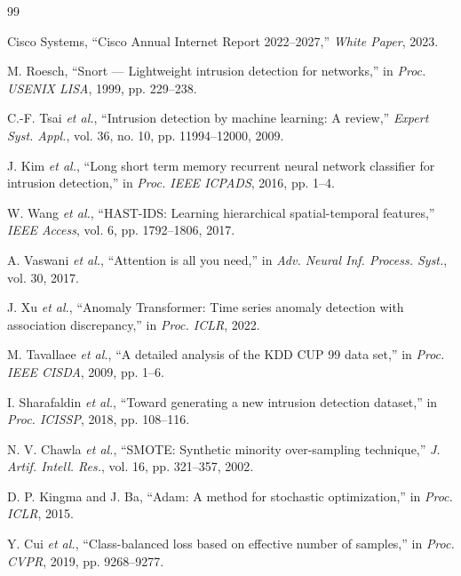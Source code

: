 \documentclass[conference]{IEEEtran}
\begin{document}
\balance
\begin{thebibliography}{99}

	Cisco Systems, ``Cisco Annual Internet Report 2022--2027,''
	\textit{White Paper}, 2023.

	M. Roesch, ``Snort --- Lightweight intrusion detection for networks,''
	in \textit{Proc. USENIX LISA}, 1999, pp. 229--238.

	C.-F. Tsai \textit{et al.}, ``Intrusion detection by machine learning:
	A review,'' \textit{Expert Syst. Appl.}, vol. 36, no. 10,
	pp. 11994--12000, 2009.

	J. Kim \textit{et al.}, ``Long short term memory recurrent neural
	network classifier for intrusion detection,''
	in \textit{Proc. IEEE ICPADS}, 2016, pp. 1--4.

	W. Wang \textit{et al.}, ``HAST-IDS: Learning hierarchical
	spatial-temporal features,'' \textit{IEEE Access}, vol. 6,
	pp. 1792--1806, 2017.

	A. Vaswani \textit{et al.}, ``Attention is all you need,''
	in \textit{Adv. Neural Inf. Process. Syst.}, vol. 30, 2017.

	J. Xu \textit{et al.}, ``Anomaly Transformer: Time series anomaly
	detection with association discrepancy,''
	in \textit{Proc. ICLR}, 2022.

	M. Tavallaee \textit{et al.}, ``A detailed analysis of the KDD CUP
	99 data set,'' in \textit{Proc. IEEE CISDA}, 2009, pp. 1--6.

	I. Sharafaldin \textit{et al.}, ``Toward generating a new intrusion
	detection dataset,'' in \textit{Proc. ICISSP}, 2018, pp. 108--116.

	N. V. Chawla \textit{et al.}, ``SMOTE: Synthetic minority
	over-sampling technique,'' \textit{J. Artif. Intell. Res.},
	vol. 16, pp. 321--357, 2002.

	D. P. Kingma and J. Ba, ``Adam: A method for stochastic
	optimization,'' in \textit{Proc. ICLR}, 2015.

	Y. Cui \textit{et al.}, ``Class-balanced loss based on effective
	number of samples,'' in \textit{Proc. CVPR}, 2019, pp. 9268--9277.

\end{thebibliography}

\end{document}
